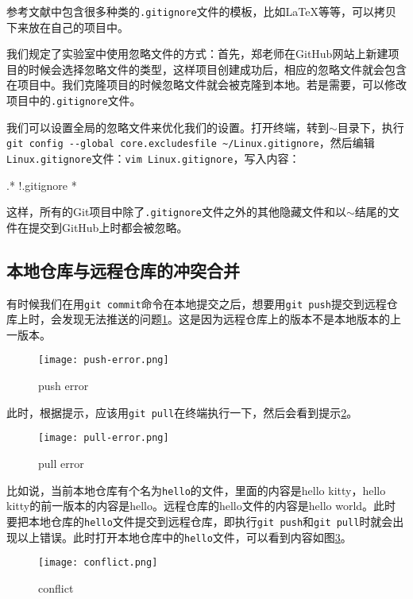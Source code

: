\documentclass[a4paper,12pt]{article}
\begin{document}
参考文献\cite{7:misc}中包含很多种类的\verb|.gitignore|文件的模板，比如\LaTeX 等等，可以拷贝下来放在自己的项目中。

我们规定了实验室中使用忽略文件的方式：首先，郑老师在GitHub网站上新建项目的时候会选择忽略文件的类型，这样项目创建成功后，相应的忽略文件就会包含在项目中。我们克隆项目的时候忽略文件就会被克隆到本地。若是需要，可以修改项目中的\verb|.gitignore|文件。

我们可以设置全局的忽略文件来优化我们的设置。打开终端，转到$\sim$目录下，执行\lstinline|git config --global core.excludesfile ~/Linux.gitignore|，然后编辑\verb|Linux.gitignore|文件：\lstinline|vim Linux.gitignore|，写入内容：
\begin{plaintext}
.*
!.gitignore
*~
\end{plaintext}
这样，所有的Git项目中除了\verb|.gitignore|文件之外的其他隐藏文件和以$\sim$结尾的文件在提交到GitHub上时都会被忽略。

\subsection{本地仓库与远程仓库的冲突合并}

有时候我们在用\lstinline|git commit|命令在本地提交之后，想要用\lstinline|git push|提交到远程仓库上时，会发现无法推送的问题\ref{fig:6}。这是因为远程仓库上的版本不是本地版本的上一版本。

\begin{figure}[!htb] %
\centering
\texttt{[image: push-error.png]}
\caption{push error}\label{fig:6}
\end{figure}

此时，根据提示，应该用\lstinline|git pull|在终端执行一下，然后会看到提示\ref{fig:7}。

\begin{figure}[!htb] %
\centering
\texttt{[image: pull-error.png]}
\caption{pull error}\label{fig:7}
\end{figure}

比如说，当前本地仓库有个名为\verb|hello|的文件，里面的内容是hello kitty，hello kitty的前一版本的内容是hello。远程仓库的hello文件的内容是hello world。此时要把本地仓库的\verb|hello|文件提交到远程仓库，即执行\lstinline|git push|和\lstinline|git pull|时就会出现以上错误。此时打开本地仓库中的\verb|hello|文件，可以看到内容如图\ref{fig:8}。

\begin{figure}[!htb] %
\centering
\texttt{[image: conflict.png]}
\caption{conflict}\label{fig:8}
\end{figure}
\end{document}
